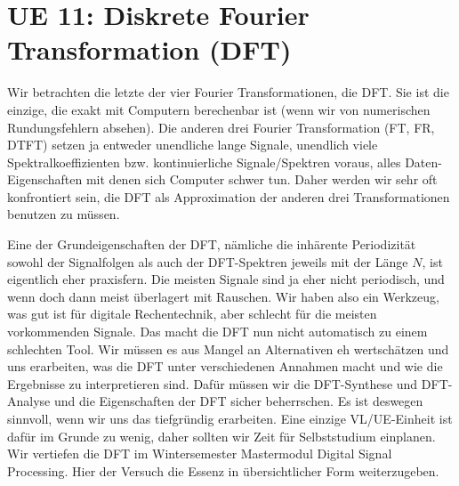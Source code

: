 \newpage
\section{UE 11: Diskrete Fourier Transformation (DFT)}
%
Wir betrachten die letzte der vier Fourier Transformationen, die DFT.
Sie ist die einzige, die exakt mit Computern berechenbar ist (wenn wir
von numerischen Rundungsfehlern absehen).
%
Die anderen drei Fourier Transformation (FT, FR, DTFT) setzen ja entweder
unendliche lange Signale, unendlich viele Spektralkoeffizienten bzw.
kontinuierliche Signale/Spektren
voraus, alles Daten-Eigenschaften mit denen sich Computer schwer tun.
%
Daher werden wir sehr oft konfrontiert sein, die DFT als Approximation
der anderen drei Transformationen benutzen zu müssen.
%

Eine der Grundeigenschaften der DFT, nämliche die inhärente
Periodizität sowohl der Signalfolgen als auch der DFT-Spektren jeweils mit
der Länge $N$, ist eigentlich
eher praxisfern. Die meisten Signale sind ja eher nicht periodisch, und wenn
doch dann meist überlagert mit Rauschen.
%
Wir haben also ein Werkzeug, was gut ist für digitale Rechentechnik, aber
schlecht für die meisten vorkommenden Signale.
%
Das macht die DFT nun nicht automatisch zu einem schlechten Tool. Wir müssen
es aus Mangel an Alternativen eh wertschätzen und uns erarbeiten, was die
DFT unter verschiedenen Annahmen macht und wie die Ergebnisse zu interpretieren
sind.
%
Dafür müssen wir die DFT-Synthese und DFT-Analyse
und die Eigenschaften der DFT sicher beherrschen.
%
%
Es ist deswegen sinnvoll, wenn wir uns das tiefgründig erarbeiten. Eine einzige
VL/UE-Einheit ist dafür im Grunde zu wenig, daher sollten wir Zeit für
Selbststudium einplanen. Wir vertiefen die DFT im Wintersemester
Mastermodul Digital Signal Processing.
Hier der Versuch die Essenz in übersichtlicher Form weiterzugeben.

